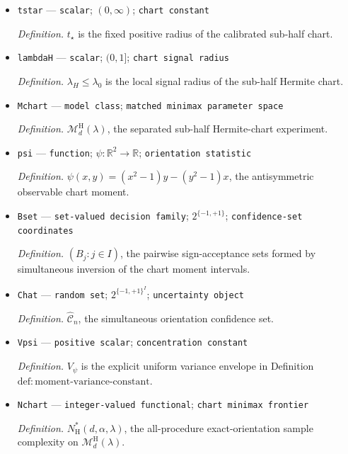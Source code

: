 \documentclass{article}
\begin{document}
\begin{itemize}
  \item \texttt{tstar} --- \texttt{scalar}; \((0,\infty)\); \texttt{chart constant}
  \par\smallskip\noindent\emph{Definition.} \(t_\star\) is the fixed positive radius of the calibrated sub-half chart.
  \item \texttt{lambdaH} --- \texttt{scalar}; \((0,1]\); \texttt{chart signal radius}
  \par\smallskip\noindent\emph{Definition.} \(\lambda_H\le\lambda_0\) is the local signal radius of the sub-half Hermite chart.
  \item \texttt{Mchart} --- \texttt{model class}; \texttt{matched minimax parameter space}
  \par\smallskip\noindent\emph{Definition.} \(\mathcal M_d^{\mathrm H}(\lambda)\), the separated sub-half Hermite-chart experiment.
  \item \texttt{psi} --- \texttt{function}; \(\psi:\mathbb R^2\to\mathbb R\); \texttt{orientation statistic}
  \par\smallskip\noindent\emph{Definition.} \(\psi(x,y)=(x^2-1)y-(y^2-1)x\), the antisymmetric observable chart moment.
  \item \texttt{Bset} --- \texttt{set-\allowbreak{}valued decision family}; \(2^{\{-1,+1\}}\); \texttt{confidence-\allowbreak{}set coordinates}
  \par\smallskip\noindent\emph{Definition.} \((B_j:j\in I)\), the pairwise sign-acceptance sets formed by simultaneous inversion of the chart moment intervals.
  \item \texttt{Chat} --- \texttt{random set}; \(2^{\{-1,+1\}^I}\); \texttt{uncertainty object}
  \par\smallskip\noindent\emph{Definition.} \(\widehat{\mathcal C}_n\), the simultaneous orientation confidence set.
  \item \texttt{Vpsi} --- \texttt{positive scalar}; \texttt{concentration constant}
  \par\smallskip\noindent\emph{Definition.} \(V_\psi\) is the explicit uniform variance envelope in Definition \(\mathrm{def:moment\text{-}variance\text{-}constant}\).
  \item \texttt{Nchart} --- \texttt{integer-\allowbreak{}valued functional}; \texttt{chart minimax frontier}
  \par\smallskip\noindent\emph{Definition.} \(N_{\mathrm H}^*(d,\alpha,\lambda)\), the all-procedure exact-orientation sample complexity on \(\mathcal M_d^{\mathrm H}(\lambda)\).
\end{itemize}
\end{document}
